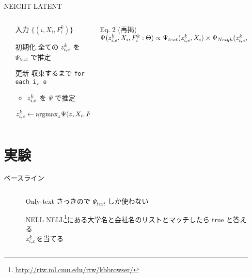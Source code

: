 \documentclass[12pt, dvipdfmx, default, cjk]{beamer}
\begin{document}
\begin{frame}[fragile]{NEIGHT-LATENT}
  \begin{columns}
    \begin{column}{0.4\textwidth}
      \begin{enumerate}
        \item[入力] $\{ (i, X_i, F^k_i) \}$
        \item[初期化] 全ての $z^k_{i,e}$ を $\Psi_{text}$ で推定
        \item[更新] 収束するまで \verb+for-each i, e+
          \begin{itemize}
            \item $z^k_{i,e}$ を $\Psi$ で推定
          \end{itemize}
          \[
            z^k_{i,e} \leftarrow \textrm{argmax}_z \Psi(z, X_i, F^k_i)
          \]
      \end{enumerate}
    \end{column}
    \begin{column}{0.5\textwidth}
      \begin{alertblock}{Eq. 2 (再掲)}
        $\Psi(z^k_{i,e}, X_i, F^k_i  :  \Theta)
          \propto
          \Psi_{text}(z^k_{i,e}, X_i) \times
          \Psi_{Neigh}(z^k_{i,e}, F^k_i)$
      \end{alertblock}
    \end{column}
  \end{columns}
\end{frame}

\section{実験}

\begin{frame}{ベースライン}
  \begin{columns}
    \begin{column}{0.1\textwidth}
    \end{column}
    \begin{column}{0.9\textwidth}
      \begin{itemize}
        \item [Only-text] さっきので $\Psi_{text}$ しか使わない
        \item [NELL] NELL\footnote{\url{http://rtw.ml.cmu.edu/rtw/kbbrowser/}}にある大学名と会社名のリストとマッチしたら true と答える \\ $z^k_{i,x}$を当てる
      \end{itemize}
    \end{column}
  \end{columns}
\end{frame}
\end{document}
